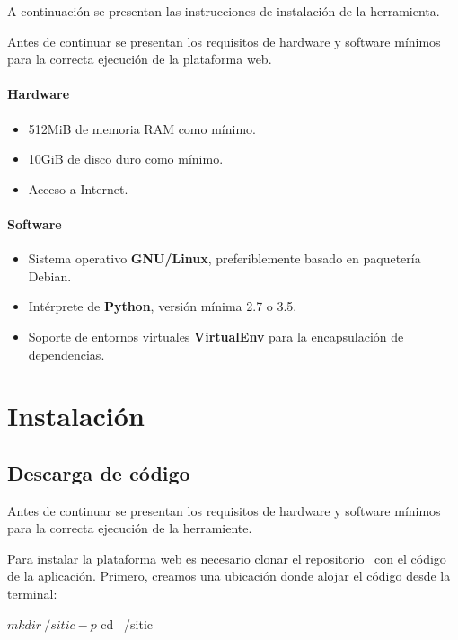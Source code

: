 A continuación se presentan las instrucciones de instalación de la herramienta.

Antes de continuar se presentan los requisitos de hardware y software mínimos
para la correcta ejecución de la plataforma web.

\paragraph{Hardware}

\begin{itemize}
\item 512MiB de memoria RAM como mínimo.
\item 10GiB de disco duro como mínimo.
\item Acceso a Internet.
\end{itemize}

\paragraph{Software}

\begin{itemize}
\item Sistema operativo \textbf{GNU/Linux}, preferiblemente basado en paquetería Debian.
\item Intérprete de \textbf{Python}, versión mínima 2.7 o 3.5.
\item Soporte de entornos virtuales \textbf{VirtualEnv} para la encapsulación de dependencias.
\end{itemize}

\section{Instalación}

\subsection{Descarga de código}

Antes de continuar se presentan los requisitos de hardware y software mínimos
para la correcta ejecución de la herramiente.

Para instalar la plataforma web es necesario clonar el repositorio~\cite{repositorio}
con el código de la aplicación. Primero, creamos una ubicación donde alojar el
código desde la terminal:

\begin{bashcode}
$ mkdir ~/sitic -p
$ cd ~/sitic
\end{bashcode}

